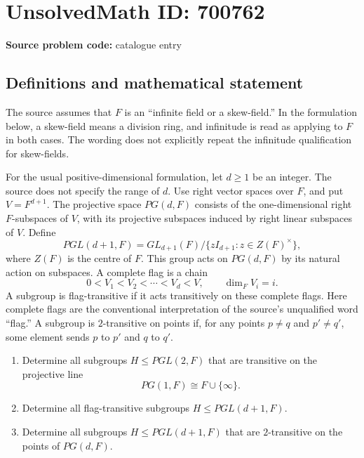 \documentclass[11pt]{article}
\begin{document}
\section*{UnsolvedMath ID: 700762}
\textbf{Source problem code:} catalogue entry
\subsection{Definitions and mathematical statement}
The source assumes that \(F\) is an ``infinite field or a skew-field.'' In the formulation below, a skew-field means a division ring, and infinitude is read as applying to \(F\) in both cases. The wording does not explicitly repeat the infinitude qualification for skew-fields.

For the usual positive-dimensional formulation, let \(d\geq 1\) be an integer. The source does not specify the range of \(d\). Use right vector spaces over \(F\), and put \(V=F^{d+1}\). The projective space \(PG(d,F)\) consists of the one-dimensional right \(F\)-subspaces of \(V\), with its projective subspaces induced by right linear subspaces of \(V\). Define
\[
PGL(d+1,F)=GL_{d+1}(F)/\{zI_{d+1}:z\in Z(F)^\times\},
\]
where \(Z(F)\) is the centre of \(F\). This group acts on \(PG(d,F)\) by its natural action on subspaces. A complete flag is a chain
\[
0<V_1<V_2<\cdots<V_d<V,
\qquad \dim_F V_i=i.
\]
A subgroup is flag-transitive if it acts transitively on these complete flags. Here complete flags are the conventional interpretation of the source's unqualified word ``flag.'' A subgroup is \(2\)-transitive on points if, for any points \(p\ne q\) and \(p'\ne q'\), some element sends \(p\) to \(p'\) and \(q\) to \(q'\).

\begin{enumerate}
\item[(a)] Determine all subgroups \(H\leq PGL(2,F)\) that are transitive on the projective line
\[
PG(1,F)\cong F\cup\{\infty\}.
\]
\item[(c)] Determine all flag-transitive subgroups \(H\leq PGL(d+1,F)\).
\item[(d)] Determine all subgroups \(H\leq PGL(d+1,F)\) that are \(2\)-transitive on the points of \(PG(d,F)\).
\end{enumerate}
\end{document}
